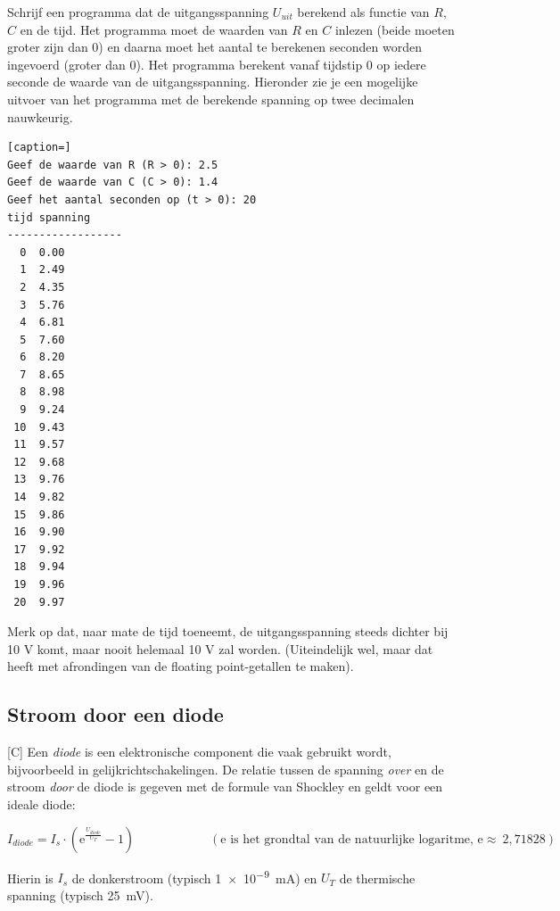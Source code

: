 \documentclass[a4paper,10pt,fleqn,twoside]{article}
\begin{document}
Schrijf een programma dat de uitgangsspanning $U_{uit}$ berekend als functie van $R$, $C$ en de tijd. Het programma moet de waarden van $R$ en $C$ inlezen (beide moeten groter zijn dan 0) en daarna moet het aantal te berekenen seconden worden ingevoerd (groter dan 0). Het programma berekent vanaf tijdstip 0 op iedere seconde de waarde van de uitgangsspanning. Hieronder zie je een mogelijke uitvoer van het programma met de berekende spanning op twee decimalen nauwkeurig.

\begin{lstlisting}[caption=]
Geef de waarde van R (R > 0): 2.5
Geef de waarde van C (C > 0): 1.4
Geef het aantal seconden op (t > 0): 20
tijd spanning
------------------
  0  0.00
  1  2.49
  2  4.35
  3  5.76
  4  6.81
  5  7.60
  6  8.20
  7  8.65
  8  8.98
  9  9.24
 10  9.43
 11  9.57
 12  9.68
 13  9.76
 14  9.82
 15  9.86
 16  9.90
 17  9.92
 18  9.94
 19  9.96
 20  9.97
\end{lstlisting}

Merk op dat, naar mate de tijd toeneemt, de uitgangsspanning steeds dichter bij 10 V komt, maar nooit helemaal 10 V zal worden. (Uiteindelijk wel, maar dat heeft met afrondingen van de floating point-getallen te maken).

\subsection{Stroom door een diode}[C]
Een \textsl{diode} is een elektronische component die vaak gebruikt wordt, bijvoorbeeld in gelijkrichtschakelingen. De relatie tussen de spanning \textsl{over} en de stroom \textsl{door} de diode is gegeven met de formule van Shockley en geldt voor een ideale diode:

\begin{equation*}
I_{diode} = I_s\cdot(\mathrm{e}^{\frac{U_{diode}}{U_T}}-1) \qquad\qquad\qquad (\text{e is het grondtal van de natuurlijke logaritme, e}\approx\ 2,71828)
\end{equation*}

Hierin is $I_s$ de donkerstroom (typisch \SI{1e-9}{\milli\ampere}) en $U_T$ de thermische spanning (typisch \SI{25}{\milli\volt}).

\begin{figure}[!ht]
\centering
{}
\end{figure}
\end{document}
